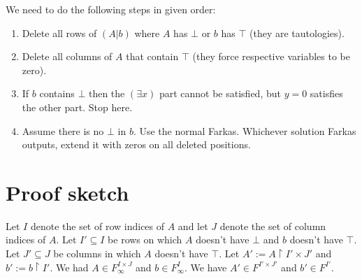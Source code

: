 \documentclass[]{article}
\begin{document}
We need to do the following steps in given order:
\begin{enumerate}
\item Delete all rows of $(A|b)$ where $A$ has $\bot$ or $b$ has $\top$
(they are tautologies).
\item Delete all columns of $A$ that contain $\top$
(they force respective variables to be zero).
\item If $b$ contains $\bot$ then the $(\exists x)$ part cannot be satisfied,
but $y = 0$ satisfies the other part. Stop here.
\item Assume there is no $\bot$ in $b$. Use the normal Farkas.
Whichever solution Farkas outputs, extend it with zeros on
all deleted positions.
\end{enumerate}

\section{Proof sketch}

Let $I$ denote the set of row indices of $A$ and
let $J$ denote the set of column indices of $A$.
Let $I' \subseteq I$ be rows on which $A$ doesn't have $\bot$ and $b$ doesn't have $\top$.
Let $J' \subseteq J$ be columns in which $A$ doesn't have $\top$.
Let $A' := A \restriction I' \times J'$ and $b' := b \restriction I'$.
We had $A \in F_\infty^{I \times J}$ and $b \in F_\infty^I$.
We have $A' \in F^{I' \times J'}$ and $b' \in F^{I'}$.
\end{document}
